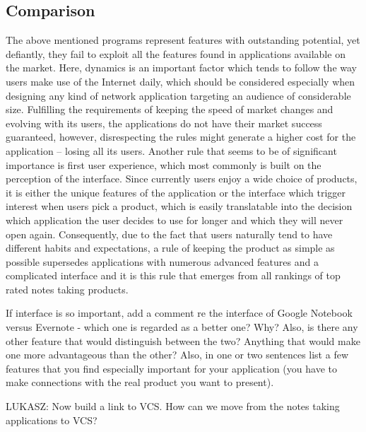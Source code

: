 \subsection{Comparison}
The above mentioned programs represent features with outstanding potential, yet defiantly, they fail to exploit all the features found in applications available on the market. Here, dynamics is an important factor which tends to follow the way users make use of the Internet daily, which should be considered especially when designing any kind of network application targeting an audience of considerable size. Fulfilling the requirements of keeping the speed of market changes and evolving with its users, the applications do not have their market success guaranteed, however, disrespecting the rules might generate a higher cost for the application -- losing all its users. Another rule that seems to be of significant importance is first user experience, which most commonly is built on the perception of the interface. Since currently users enjoy a wide choice of products, it is either the unique features of the application or the interface which trigger interest when users pick a product, which is easily translatable into the decision which application the user decides to use for longer and which they will never open again. Consequently, due to the fact that users naturally tend to have different habits and expectations, a rule of keeping the product as simple as possible supersedes applications with numerous advanced features and a complicated interface and it is this rule that emerges from all rankings of top rated notes taking products. 

If interface is so important, add a comment re the interface of Google Notebook versus Evernote - which one is regarded as a better one? Why? Also, is there any other feature that would distinguish between the two? Anything that would make one more advantageous than the other? Also, in one or two sentences list a few features that you find especially important for your application (you have to make connections with the real product you want to present).

LUKASZ: Now build a link to VCS. How can we move from the notes taking applications to VCS? 
 
